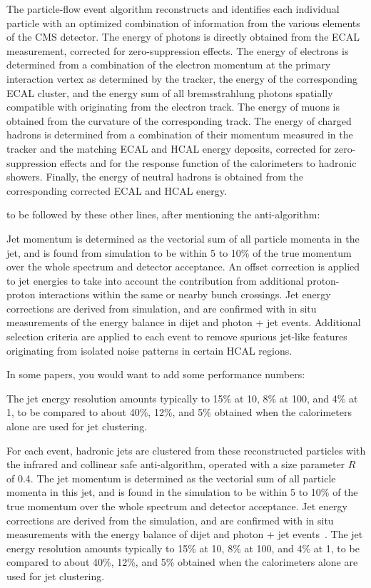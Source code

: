 The particle-flow event algorithm reconstructs and identifies each individual particle with an optimized combination of information from the various elements of the CMS detector. The energy of photons is directly obtained from the ECAL measurement, corrected for zero-suppression effects. The energy of electrons is determined from a combination of the electron momentum at the primary interaction vertex as determined by the tracker, the energy of the corresponding ECAL cluster, and the energy sum of all bremsstrahlung photons spatially compatible with originating from the electron track. The energy of muons is obtained from the curvature of the corresponding track. The energy of charged hadrons is determined from a combination of their momentum measured in the tracker and the matching ECAL and HCAL energy deposits, corrected for zero-suppression effects and for the response function of the calorimeters to hadronic showers. Finally, the energy of neutral hadrons is obtained from the corresponding corrected ECAL and HCAL energy.

to be followed by these other lines, after mentioning the anti-\kt algorithm:

Jet momentum is determined as the vectorial sum of all particle momenta in the jet, and is found from simulation to be within 5 to 10\% of the true momentum over the whole \pt spectrum and detector acceptance. An offset correction is applied to jet energies to take into account the contribution from additional proton-proton interactions within the same or nearby bunch crossings. Jet energy corrections are derived from simulation, and are confirmed with in situ measurements of the energy balance in dijet and photon + jet events. Additional selection criteria are applied to each event to remove spurious jet-like features originating from isolated noise patterns in certain HCAL regions.

In some papers, you would want to add some performance numbers:

The jet energy resolution amounts typically to 15\% at 10\GeV, 8\% at 100\GeV, and 4\% at 1\TeV, to be compared to about 40\%, 12\%, and 5\% obtained when the calorimeters alone are used for jet clustering.

For each event, hadronic jets are clustered from these reconstructed particles with the infrared and collinear safe anti-\kt algorithm, operated with a size parameter $R$ of 0.4. The jet momentum is determined as the vectorial sum of all particle momenta in this jet, and is found in the simulation to be within 5 to 10\% of the true momentum over the whole \pt spectrum and detector acceptance. Jet energy corrections are derived from the simulation, and are confirmed with in situ measurements with the energy balance of dijet and photon + jet events~\cite{Chatrchyan:2011ds}. The jet energy resolution amounts typically to 15\% at 10\GeV, 8\% at 100\GeV, and 4\% at 1\TeV, to be compared to about 40\%, 12\%, and 5\% obtained when the calorimeters alone are used for jet clustering. 

